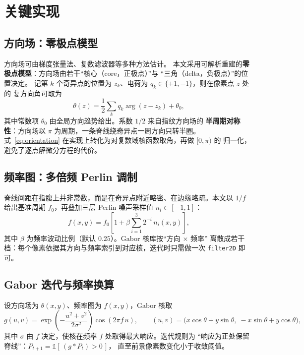 \documentclass[UTF8, fontset=windows, a4paper, 11pt]{ctexart}
\begin{document}
\section{关键实现}

\subsection{方向场：零极点模型}

方向场可由梯度张量法、复数滤波器等多种方法估计\cite{bazen2002,ratha1995}。
本文采用可解析重建的\textbf{零极点模型}：方向场由若干``核心（core，正极点）''与
``三角（delta，负极点）''的位置决定。
记第 $k$ 个奇异点的位置为 $z_k$、电荷为 $q_k \in \{+1,-1\}$，则在像素点 $z$ 处的
复方向角可取为
\begin{equation}
\theta(z) = \frac{1}{2}\sum_{k} q_k \arg(z - z_k) + \theta_0 ,
\label{eq:orientation}
\end{equation}
其中常数项 $\theta_0$ 由全局方向趋势给出。系数 $1/2$ 来自指纹方向场的
\textbf{半周期对称性}：方向场以 $\pi$ 为周期，一条脊线绕奇异点一周方向只转半圈。
式~\eqref{eq:orientation} 在实现上转化为对复数域核函数取角，再做 $[0,\pi)$ 的
归一化，避免了逐点解微分方程的代价。

\subsection{频率图：多倍频 Perlin 调制}

脊线间距在指腹上并非常数，而是在奇异点附近略密、在边缘略疏。本文以
$1/f$ 给出基准周期 $f_0$，再叠加三层 Perlin 噪声\cite{perlin1985}采样值
$n_i \in [-1,1]$：
\begin{equation}
f(x,y) = f_0 \left[1 + \beta \sum_{i=1}^{3} 2^{-i}\, n_i(x,y)\right],
\label{eq:freq}
\end{equation}
其中 $\beta$ 为频率波动比例（默认 $0.25$）。Gabor 核库按``方向 $\times$ 频率''
离散成若干档：每个像素依据其方向与频率索引到对应核，迭代时只需做一次
\texttt{filter2D} 即可。

\subsection{Gabor 迭代与频率换算}

设方向场为 $\theta(x,y)$、频率图为 $f(x,y)$，Gabor 核取
\begin{equation}
g(u,v) = \exp\!\left(-\frac{u^2+v^2}{2\sigma^2}\right)
         \cos\!\left(2\pi f\, u\right),\qquad
(u,v) = \bigl(x\cos\theta + y\sin\theta,\; -x\sin\theta + y\cos\theta\bigr),
\end{equation}
其中 $\sigma$ 由 $f$ 决定，使核在频率 $f$ 处取得最大响应。迭代规则为
``响应为正处保留脊线''：$P_{t+1} = \mathbb{1}\left[\,(g * P_t) > 0\,\right]$，
直至前景像素数变化小于收敛阈值。
\end{document}
